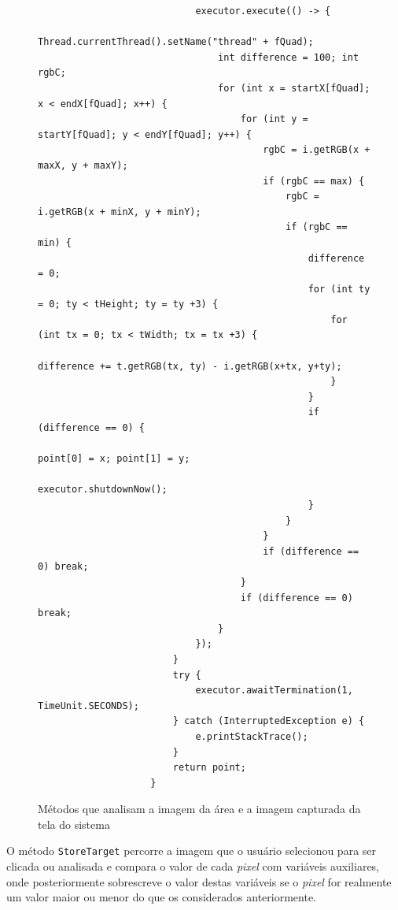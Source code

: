 \documentclass[tg]{mdtufsm}
\begin{document}
\begin{figure}[!htb]
\begin{lstlisting}
                            executor.execute(() -> {
                                Thread.currentThread().setName("thread" + fQuad);
                                int difference = 100; int rgbC;
                                for (int x = startX[fQuad]; x < endX[fQuad]; x++) {
                                    for (int y = startY[fQuad]; y < endY[fQuad]; y++) {
                                        rgbC = i.getRGB(x + maxX, y + maxY);
                                        if (rgbC == max) {
                                            rgbC = i.getRGB(x + minX, y + minY);
                                            if (rgbC == min) {
                                                difference = 0;
                                                for (int ty = 0; ty < tHeight; ty = ty +3) {
                                                    for (int tx = 0; tx < tWidth; tx = tx +3) {
                                                        difference += t.getRGB(tx, ty) - i.getRGB(x+tx, y+ty);
                                                    }
                                                }
                                                if (difference == 0) {
                                                    point[0] = x; point[1] = y;
                                                    executor.shutdownNow();
                                                }
                                            }
                                        }
                                        if (difference == 0) break;
                                    }
                                    if (difference == 0) break;
                                }
                            });
                        }
                        try {
                            executor.awaitTermination(1, TimeUnit.SECONDS);
                        } catch (InterruptedException e) {
                            e.printStackTrace();
                        }
                        return point;
                    }
                    \end{lstlisting}
                        \caption{Métodos que analisam a imagem da área e a imagem capturada da tela do sistema}
                    	\label{code:ImageSearch.java}
                    \end{figure}

                    O método \texttt{StoreTarget} percorre a imagem que o usuário selecionou para ser clicada ou analisada e compara o valor de cada \emph{pixel} com variáveis auxiliares, onde posteriormente sobrescreve o valor destas variáveis se o \emph{pixel} for realmente um valor maior ou menor do que os considerados anteriormente.
\end{document}
